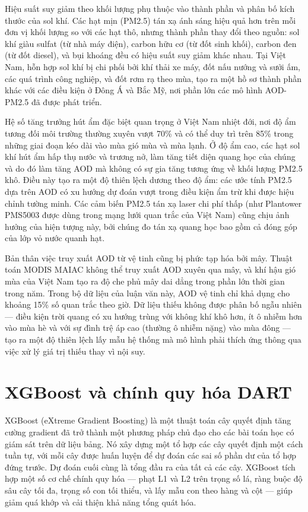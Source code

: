 Hiệu suất suy giảm theo khối lượng phụ thuộc vào thành phần và phân bố kích thước của sol khí. Các hạt mịn (PM2.5) tán xạ ánh sáng hiệu quả hơn trên mỗi đơn vị khối lượng so với các hạt thô, nhưng thành phần thay đổi theo nguồn: sol khí giàu sulfat (từ nhà máy điện), carbon hữu cơ (từ đốt sinh khối), carbon đen (từ đốt diesel), và bụi khoáng đều có hiệu suất suy giảm khác nhau. Tại Việt Nam, hỗn hợp sol khí bị chi phối bởi khí thải xe máy, đốt nấu nướng và sưởi ấm, các quá trình công nghiệp, và đốt rơm rạ theo mùa, tạo ra một hồ sơ thành phần khác với các điều kiện ở Đông Á và Bắc Mỹ, nơi phần lớn các mô hình AOD-PM2.5 đã được phát triển.

Hệ số tăng trưởng hút ẩm đặc biệt quan trọng ở Việt Nam nhiệt đới, nơi độ ẩm tương đối môi trường thường xuyên vượt 70\% và có thể duy trì trên 85\% trong những giai đoạn kéo dài vào mùa gió mùa và mùa lạnh. Ở độ ẩm cao, các hạt sol khí hút ẩm hấp thụ nước và trương nở, làm tăng tiết diện quang học của chúng và do đó làm tăng AOD mà không có sự gia tăng tương ứng về khối lượng PM2.5 khô. Điều này tạo ra một độ thiên lệch dương theo độ ẩm: các ước tính PM2.5 dựa trên AOD có xu hướng dự đoán vượt trong điều kiện ẩm trừ khi được hiệu chỉnh tường minh. Các cảm biến PM2.5 tán xạ laser chi phí thấp (như Plantower PMS5003 được dùng trong mạng lưới quan trắc của Việt Nam) cũng chịu ảnh hưởng của hiện tượng này, bởi chúng đo tán xạ quang học bao gồm cả đóng góp của lớp vỏ nước quanh hạt.

Bản thân việc truy xuất AOD từ vệ tinh cũng bị phức tạp hóa bởi mây. Thuật toán MODIS MAIAC không thể truy xuất AOD xuyên qua mây, và khí hậu gió mùa của Việt Nam tạo ra độ che phủ mây dai dẳng trong phần lớn thời gian trong năm. Trong bộ dữ liệu của luận văn này, AOD vệ tinh chỉ khả dụng cho khoảng 15\% số quan trắc theo giờ. Dữ liệu thiếu không được phân bố ngẫu nhiên --- điều kiện trời quang có xu hướng trùng với không khí khô hơn, ít ô nhiễm hơn vào mùa hè và với sự đình trệ áp cao (thường ô nhiễm nặng) vào mùa đông --- tạo ra một độ thiên lệch lấy mẫu hệ thống mà mô hình phải thích ứng thông qua việc xử lý giá trị thiếu thay vì nội suy.


\section{XGBoost và chính quy hóa DART}

XGBoost (eXtreme Gradient Boosting) là một thuật toán cây quyết định tăng cường gradient đã trở thành một phương pháp chủ đạo cho các bài toán học có giám sát trên dữ liệu bảng. Nó xây dựng một tổ hợp các cây quyết định một cách tuần tự, với mỗi cây được huấn luyện để dự đoán các sai số phần dư của tổ hợp đứng trước. Dự đoán cuối cùng là tổng đầu ra của tất cả các cây. XGBoost tích hợp một số cơ chế chính quy hóa --- phạt L1 và L2 trên trọng số lá, ràng buộc độ sâu cây tối đa, trọng số con tối thiểu, và lấy mẫu con theo hàng và cột --- giúp giảm quá khớp và cải thiện khả năng tổng quát hóa.

